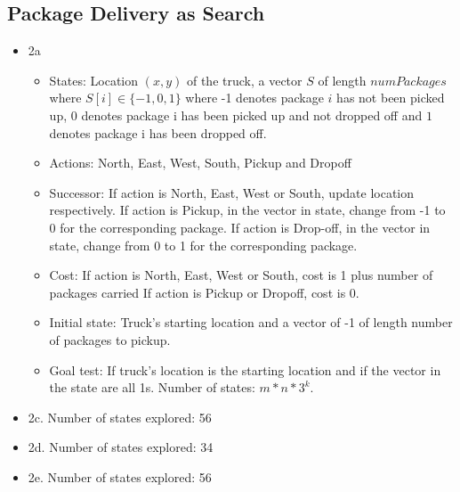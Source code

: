 \documentclass[11pt]{article}
\begin{document}
\begin{onehalfspace}
    \section{Package Delivery as Search}
    \begin{itemize}
    	\item
    	2a
	\begin{itemize}
		\item
		States: Location $(x, y)$ of the truck, a vector $S$ of length $numPackages$ where $S[i]
		             \in \{-1, 0, 1\}$ where -1 denotes package $i$ has not been picked up, $0$ denotes
		             package i has been picked up and not dropped off and $1$ denotes package i 
		             has been dropped off.
		\item
		Actions: North, East, West, South, Pickup and Dropoff
		\item
		Successor: If action is North, East, West or South, update location respectively.
		                   If action is Pickup, in the vector in state, change from -1 to 0 for the 
		                   corresponding package.
		                   If action is Drop-off, in the vector in state, change from 0 to 1 for the
		                   corresponding package.
		\item
		Cost: If action is North, East, West or South, cost is 1 plus number of packages carried
			 If action is Pickup or Dropoff, cost is 0.
		
		 \item
		 Initial state: Truck's starting location and a vector of -1 of length number of packages to 
		                     pickup.
		\item
		Goal test: If truck's location is the starting location and if the vector in the state are all 1s.
		Number of states: $m*n*3^k$.
	\end{itemize}
	\item
	2c. Number of states explored: 56 
	\item
	2d. Number of states explored: 34  
	\item
	2e. Number of states explored: 56
   \end{itemize}
    \newpage{}

\end{onehalfspace}
\end{document}
